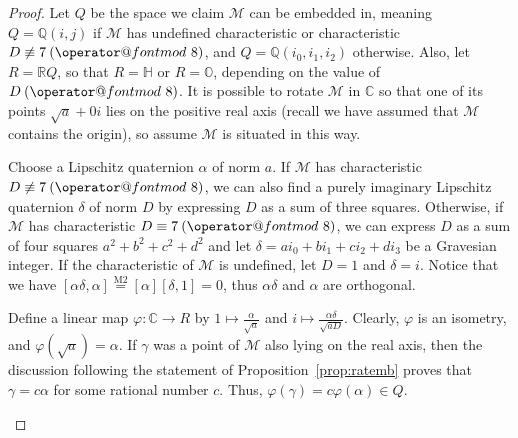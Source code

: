 \documentclass[10pt]{amsart}
\makeatletter
\newcommand{\M}{\mathcal{M}}
\newcommand{\Q}{\mathbb{Q}}
\newcommand{\R}{\mathbb{R}}
\newcommand{\C}{\mathbb{C}}
\renewcommand{\H}{\mathbb{H}}
\renewcommand{\O}{\mathbb{O}}
\newcommand{\norm}[1]{\left[#1\right]}
\DeclareRobustCommand{\pmod}{\@pmods}
\def\@pmods#1{\mkern4mu({\operator@font mod}\mkern 6mu#1)}
\makeatother
\begin{document}
\begin{proof}
Let $Q$ be the space we claim $\M$ can be embedded in, meaning $Q = \Q(i,j)$ if $\M$ has undefined characteristic or characteristic $D \not \equiv 7 \pmod{8}$, and $Q = \Q(i_0,i_1,i_2)$ otherwise.  Also, let $R = \R Q$, so that $R = \H$ or $R = \O$, depending on the value of $D \pmod{8}$.  It is possible to rotate $\M$ in $\C$ so that one of its points $\sqrt{a} + 0i$ lies on the positive real axis (recall we have assumed that $\M$ contains the origin), so assume $\M$ is situated in this way.

Choose a Lipschitz quaternion $\alpha$ of norm $a$.  If $\M$ has characteristic $D \not \equiv 7 \pmod{8}$, we can also find a purely imaginary Lipschitz quaternion $\delta$ of norm $D$ by expressing $D$ as a sum of three squares.  Otherwise, if $\M$ has characteristic $D \equiv 7 \pmod{8}$, we can express $D$ as a sum of four squares $a^2 + b^2 + c^2 + d^2$ and let $\delta = ai_0 + bi_1 + ci_2 + di_3$ be a Gravesian integer.  If the characteristic of $\M$ is undefined, let $D = 1$ and $\delta = i$.  Notice that we have $\norm{\alpha\delta, \alpha} \overset{\text{M}2}{=} \norm{\alpha}\norm{\delta,1} = 0$, thus $\alpha\delta$ and $\alpha$ are orthogonal.

Define a linear map $\varphi: \C \rightarrow R$ by $1 \mapsto \frac{\alpha}{\sqrt{a}}$ and $i \mapsto \frac{\alpha \delta}{\sqrt{aD}}$.  Clearly, $\varphi$ is an isometry, and $\varphi(\sqrt{a}) = \alpha$.  If $\gamma$ was a point of $\M$ also lying on the real axis, then the discussion following the statement of Proposition~\ref{prop:ratemb} proves that $\gamma = c\alpha$ for some rational number $c$.  Thus, $\varphi(\gamma) = c\varphi(\alpha) \in Q$.

\begin{figure}[h]
\begin{center}
\end{center}
\end{figure}
\end{proof}
\end{document}
